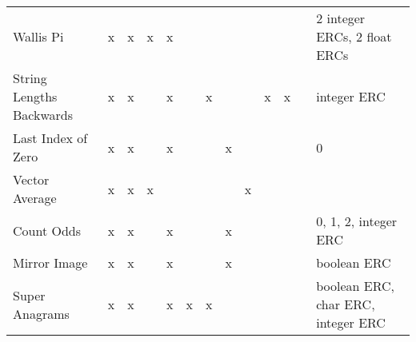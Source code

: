 \documentclass{sig-alternate}
\begin{document}
\begin{table*}[h]
\begin{tabular}{|l|ccccccccccc|p{6cm}|}
Wallis Pi                  & x    & x       & x     & x       &      &        &                    &                  &                   &       &            & 2 integer ERCs, 2 float ERCs                                                                                                                                                                                                \\
String Lengths Backwards   & x    & x       &       & x       &      & x      &                    &                  & x                 & x     &            & integer ERC                                                                                                                                                                                                                 \\
Last Index of Zero         & x    & x       &       & x       &      &        & x                  &                  &                   &       &            & 0                                                                                                                                                                                                                           \\
Vector Average             & x    & x       & x     &         &      &        &                    & x                &                   &       &            &                                                                                                                                                                                                                             \\
Count Odds                 & x    & x       &       & x       &      &        & x                  &                  &                   &       &            & 0, 1, 2, integer ERC                                                                                                                                                                                                        \\
Mirror Image               & x    & x       &       & x       &      &        & x                  &                  &                   &       &            & boolean ERC                                                                                                                                                                                                                 \\
Super Anagrams             & x    & x       &       & x       & x    & x      &                    &                  &                   &       &            & boolean ERC, char ERC, integer ERC                                                                                                                                                                                          \\

\end{tabular}
\end{table*}
\end{document}
